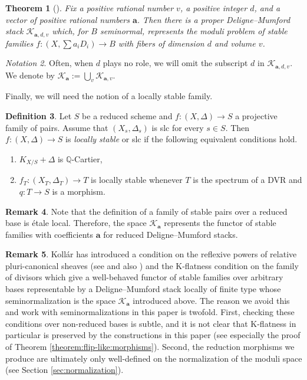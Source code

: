 \documentclass[11pt]{amsart}
\newtheorem{theorem}{Theorem}[section]
\theoremstyle{definition}
\newtheorem{definition}[theorem]{Definition}
\newtheorem{remark}[theorem]{Remark}
\theoremstyle{remark}
\newtheorem{notation}[theorem]{Notation}
\newcommand{\bQ}{{\mathbb Q}}
\newcommand{\sK}{\mathscr{K}}
\newcommand{\bfa}{\mathbf{a}}
\begin{document}
	\begin{theorem}[{\cite[Theorems 4.1 and 4.8]{kollarmodulibook}}]\label{thm:thm4.79} Fix a positive rational number $v$, a positive integer $d$, and a vector of positive rational numbers $\mathbf{a}$.
		Then there is a proper Deligne--Mumford stack $\sK_{\mathbf{a},d,v}$ which, for $B$ seminormal, represents the moduli problem of stable families $f:(X,\sum a_i D_i) \to B$ with fibers of dimension $d$ and volume $v$.
	\end{theorem}
	
	\begin{notation}\label{notation:the:moduli:space:we:use} Often, when $d$ plays no role, we will omit the subscript $d$ in $\sK_{\mathbf{a},d,v}$. We denote by $\sK_{\mathbf{a}}:=\bigcup_v \sK_{\mathbf{a},v}$.
	\end{notation}
	
	
	Finally, we will need the notion of a locally stable family.
	
	\begin{definition}\cite[Definition-Theorem 4.7]{kollarmodulibook}\label{def:locstab}
		Let $S$ be a reduced scheme and $f: (X, \Delta) \to S$
		a projective family of pairs. Assume that $(X_s,\Delta_s)$ is slc for every $s\in S$. Then $f: (X, \Delta) \to S$ is \emph{locally stable} or
		slc if the following equivalent conditions hold.
		\begin{enumerate}
			\item $K_{X/S} + \Delta$ is $\bQ$-Cartier,
			\item $f_T : (X_T, \Delta_T ) \to T$ is locally stable whenever $T$ is the spectrum of a DVR
			and $q: T \to S$ is a morphism.
		\end{enumerate}
	\end{definition}
	
	\begin{remark} Note that the definition of a family of stable pairs over a reduced base is \'etale local. Therefore, the space $\sK_{\bfa}$ represents the functor of stable families with coefficients $\bfa$ for reduced Deligne--Mumford stacks.
	\end{remark}
	
	\begin{remark} Koll\'ar has introduced a condition on the reflexive powers of relative pluri-canonical sheaves (see \cite[Chapter 9]{kollarmodulibook} and also \cite{AH, BI}) and the K-flatness condition on the family of divisors \cite{Kflat} which give a well-behaved functor of stable families over arbitrary bases representable by a Deligne--Mumford stack locally of finite type whose seminormalization is the space $\sK_{\bfa}$ introduced above. The reason we avoid this and work with seminormalizations in this paper is twofold. First, checking these conditions over non-reduced bases is subtle, and it is not clear that K-flatness in particular is preserved by the constructions in this paper (see especially the proof of Theorem \ref{theorem:flip-like:morphisms}). Second, the reduction morphisms we produce are ultimately only well-defined on the normalization of the moduli space (see Section \ref{sec:normalization}).
	\end{remark}
	
\end{document}
